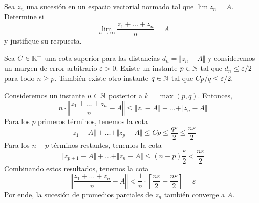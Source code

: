 \begin{exercise}
Sea $z_n$ una sucesión en un espacio vectorial normado tal que $\lim z_n = A$. Determine si
$$\lim_{n \to \infty} \frac {z_1 + \dots + z_n} n = A$$
y justifique su respuesta.
\end{exercise}

\begin{solution}
Sea $C \in \mathbb R^+$ una cota superior para las distancias $d_n = \Vert z_n - A \Vert$ y consideremos un margen de error arbitrario $\varepsilon > 0$. Existe un instante $p \in \mathbb N$ tal que $d_n \le \varepsilon/2$ para todo $n \ge p$. También existe otro instante $q \in \mathbb N$ tal que $Cp/q \le \varepsilon/2$.

Consideremos un instante $n \in \mathbb N$ posterior a $k = \max(p, q)$. Entonces,
$$
n \cdot \left \Vert \frac {z_1 + \dots + z_n} n - A \right \Vert
    \le \Vert z_1 - A \Vert + \dots + \Vert z_n - A \Vert
$$
Para los $p$ primeros términos, tenemos la cota
$$
\Vert z_1 - A \Vert + \dots + \Vert z_p - A \Vert
    \le Cp
    \le \frac {q\varepsilon} 2
    \le \frac {n\varepsilon} 2
$$
Para los $n-p$ términos restantes, tenemos la cota
$$
\Vert z_{p+1} - A \Vert + \dots + \Vert z_n - A \Vert
    \le (n-p) \frac \varepsilon 2
    < \frac {n\varepsilon} 2
$$
Combinando estos resultados, tenemos la cota
$$
\left \Vert \frac {z_1 + \dots + z_n} n - A \right \Vert
    < \frac 1n \cdot \left[ \frac {n\varepsilon} 2 + \frac {n\varepsilon} 2 \right]
    = \varepsilon
$$
Por ende, la sucesión de promedios parciales de $z_n$ también converge a $A$.
\end{solution}
